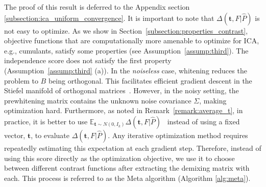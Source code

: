 \documentclass[letterpaper]{article}
\newcommand{\bt}{\pmb{t}}
\newcommand{\bk}{\color{black}}
\newcommand{\E}{\mathbb{E}}
\newcommand\bindent{%
  \begingroup
  \setlength{\itemindent}{\myindent}
  \addtolength{\algorithmicindent}{\myindent}
}
\newcommand\eindent{\endgroup}
\newlength\myindent
\newcommand{\bb}[1]{\left(#1\right)}
\newcommand{\bbb}[1]{\left[#1\right]}
\DeclareMathOperator*{\argmin}{arg\,min}
\begin{document}
The proof of this result is deferred to the Appendix section \ref{subsection:ica_uniform_convergence}. It is important to note that $\Delta(\bt,F|\hat{P})$ is not easy to optimize. As we show in Section~\ref{subsection:properties_contrast}, objective functions that are computationally more amenable to optimize for ICA, e.g., cumulants, satisfy some properties (see Assumption~\ref{assump:third}). The independence score does not satisfy the first property (Assumption~\ref{assump:third} (a)).  In the \textit{noiseless} case, whitening reduces the problem to $B$ being orthogonal. This facilitates efficient gradient descent in the Stiefel manifold of orthogonal matrices~\cite{chen2005ICA}. However, in the noisy setting, the prewhitening matrix contains the unknown noise covariance $\Sigma$, making optimization hard. Furthermore, as noted in Remark~\ref{remark:average_t}, in practice, it is better to use $\E_{\bt\sim N(0,I_k)}\Delta(\bt,F|\hat{P})$~\cite{chen2005ICA,ERIKSSON20032195,HENZE19971} instead of using a fixed vector, $\bt$, to evaluate $\Delta(\bt,F|\hat{P})$. Any iterative optimization method requires repeatedly estimating this expectation at each gradient step. Therefore, instead of using this score directly as the optimization objective, we use it to choose between different contrast functions after extracting the demixing matrix with each. This process is referred to as the Meta algorithm (Algorithm \ref{alg:meta}). \bk

\end{document}

